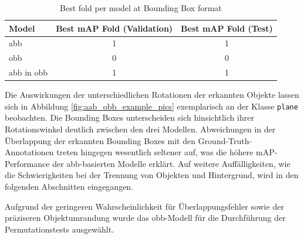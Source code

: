 \begin{table}[h]
\centering
\begin{tabular}{l c c}
\hline
\textbf{Model} & \textbf{Best mAP Fold (Validation)} & \textbf{Best mAP Fold (Test)} \\ 
\hline
abb &  1 & 1 \\
obb &  0 & 0 \\
abb in obb &  1 & 1 \\
\hline
\end{tabular}
\caption{Best fold per model at Bounding Box format}
\label{tab:best_folds_area}
\end{table}


Die Auswirkungen der unterschiedlichen Rotationen der erkannten Objekte lassen sich in Abbildung \ref{fig:aab_obb_example_pics} exemplarisch an der Klasse \texttt{plane} beobachten. Die Bounding Boxes unterscheiden sich hinsichtlich ihrer Rotationswinkel deutlich zwischen den drei Modellen. Abweichungen in der Überlappung der erkannten Bounding Boxes mit den Ground-Truth-Annotationen treten hingegen wesentlich seltener auf, was die höhere \acrshort{mAP}-Performance der \acrshort{abb}-basierten Modelle erklärt. Auf weitere Auffälligkeiten, wie die Schwierigkeiten bei der Trennung von Objekten und Hintergrund, wird in den folgenden Abschnitten eingegangen.  

Aufgrund der geringeren Wahrscheinlichkeit für Überlappungsfehler sowie der präziseren Objektumrandung wurde das \acrshort{obb}-Modell für die Durchführung der Permutationstests ausgewählt.






